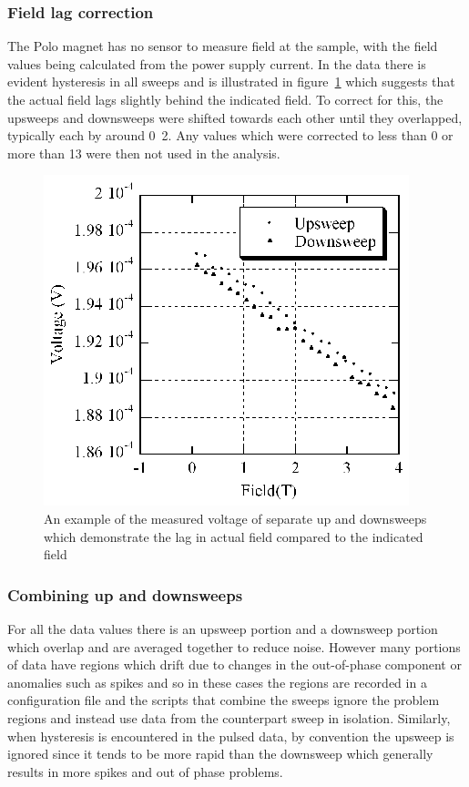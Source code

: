 \subsubsection{Field lag correction}

The Polo magnet has no sensor to measure field at the sample, with the field values being calculated from the power supply current. In the data there is evident hysteresis in all sweeps and is illustrated in figure~\ref{Fig:Exp:PoloHysteresis} which suggests that the actual field lags slightly behind the indicated field. To correct for this, the upsweeps and downsweeps were shifted towards each other until they overlapped, typically each by around \unit{0.2}{\tesla}. Any values which were corrected to less than \unit{0}{\tesla} or more than \unit{13}{\tesla} were then not used in the analysis.
\begin{figure}[htbp]
    \begin{center}
        \includegraphics[scale=0.9]{Chapter-ExperimentalTechnique/Figures/PoloHysteresis/PoloHysteresis}
        \caption{An example of the measured voltage of separate up and downsweeps which demonstrate the lag in actual field compared to the indicated field}
        \label{Fig:Exp:PoloHysteresis}
    \end{center}
\end{figure}

\subsubsection{Combining up and downsweeps}

For all the data values there is an upsweep portion and a downsweep portion which overlap and are averaged together to reduce noise. However many portions of data have regions which drift due to changes in the out-of-phase component or anomalies such as spikes and so in these cases the regions are recorded in a configuration file and the scripts that combine the sweeps ignore the problem regions and instead use data from the counterpart sweep in isolation. Similarly, when hysteresis is encountered in the pulsed data, by convention the upsweep is ignored since it tends to be more rapid than the downsweep which generally results in more spikes and out of phase problems.

